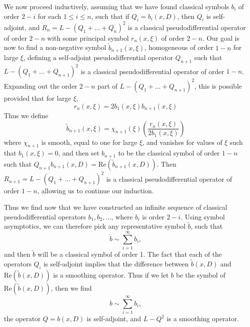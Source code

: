 \begin{example}
    We now proceed inductively, assuming that we have found classical symbols $b_i$ of order $2 - i$ for each $1 \leq i \leq n$, such that if $Q_i = b_i(x,D)$, then $Q_i$ is self-adjoint, and $R_n = L - (Q_1 + \dots + Q_n)^2$ is a classical pseudodifferential operator of order $2 - n$ with some principal symbol $r_n(x,\xi)$ of order $2 - n$. Our goal is now to find a non-negative symbol $\tilde{b}_{n+1}(x,\xi)$, homogeneous of order $1 - n$ for large $\xi$, defining a self-adjoint pseudodifferential operator $Q_{n+1}$ such that $L - (Q_1 + \dots + Q_{n+1})^2$ is a classical pseudodifferential operator of order $1 - n$. Expanding out the order $2 - n$ part of $L - (Q_1 + \dots + Q_{n+1})^2$, this is possible provided that for large $\xi$,
    \[ r_n(x,\xi) = 2 b_1(x,\xi) b_{n+1}(x,\xi) \]
    Thus we define
    \[ \tilde{b}_{n+1}(x,\xi) = \chi_{n+1}(\xi) \left( \frac{r_n(x,\xi)}{2 b_1(x,\xi)} \right) \]
    where $\chi_{n+1}$ is smooth, equal to one for large $\xi$, and vanishes for values of $\xi$ such that $b_1(x,\xi) = 0$, and then set $b_{n+1}$ to be the classical symbol of order $1 - n$ such that $Q_{n+1} b_{n+1}(x,D) = \text{Re}(\tilde{b}_{n+1}(x,D))$. Then $R_{n+1} = L - (Q_1 + \dots + Q_{n+1})^2$ is a classical pseudodifferential operator of order $1 - n$, allowing us to continue our induction.

    Thus we find now that we have constructed an infinite sequence of classical pseudodifferential operators $b_1, b_2, \dots$, where $b_i$ is order $2 - i$. Using symbol asymptotics, we can therefore pick any representative symbol $\tilde{b}$, such that
    \[ \tilde{b} \sim \sum_{i = 1}^\infty b_i, \]
    and then $\tilde{b}$ will be a classical symbol of order 1. The fact that each of the operators $Q_i$ is self-adjoint implies that the difference between $\tilde{b}(x,D)$ and $\text{Re}(\tilde{b}(x,D))$ is a smoothing operator. Thus if we let $b$ be the symbol of $\text{Re}(\tilde{b}(x,D))$, then we find
    \[ b \sim \sum_{i = 1}^\infty b_i, \]
    the operator $Q = b(x,D)$ is self-adjoint, and $L - Q^2$ is a smoothing operator.


\end{example}
